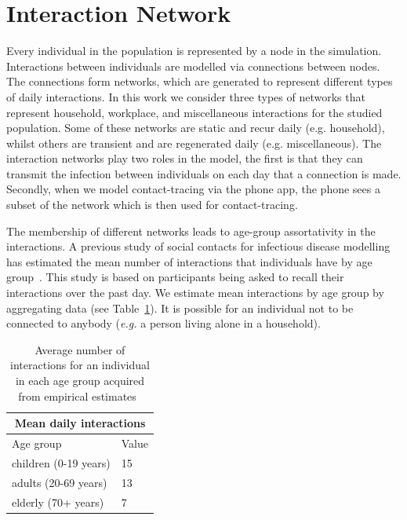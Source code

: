 \documentclass[12pt, oneside]{amsart}   	%
\begin{document}
\section{Interaction Network}\label{section_ibm_networks}

Every individual in the population is represented by a node in the simulation. 
Interactions between individuals are modelled via connections between nodes.
The connections form networks, which are generated to represent different types of daily interactions.
In this work we consider three types of networks that represent household, workplace, and miscellaneous interactions for the studied population.
Some of these networks are static and recur daily (e.g. household), whilst others are transient and are regenerated daily (e.g.  miscellaneous).
The interaction networks play two roles in the model, the first is that they can transmit the infection between individuals on each day that a connection is made.
Secondly, when we model contact-tracing via the phone app, the phone sees a subset of the network which is then used for contact-tracing.

The membership of different networks leads to age-group assortativity in the interactions.
A previous study of social contacts for infectious disease modelling has estimated the mean number of interactions that individuals have by age group~\citep{mossong2008social}.
This study is based on participants being asked to recall their interactions over the past day. 
We estimate mean interactions by age group by aggregating data (see Table~\ref{table_mean_daily_interactions}).
It is possible for an individual not to be connected to anybody (\emph{e.g.} a person living alone in a household).

\begin{table}
\centering
\begin{tabular}{ |p{5cm}|p{1.5cm}|  }
 \hline
 \multicolumn{2}{|c|}{Mean daily interactions} \\
 \hline
Age group  & Value \\
 \hline
 \hline 
children (0-19 years) & 15 \\
adults (20-69 years) & 13 \\
elderly (70+ years) & 7 \\
 \hline
\end{tabular}
\caption{Average number of interactions for an individual in each age group  acquired from empirical estimates~\citep{mossong2008social}}
\label{table_mean_daily_interactions}
\end{table}
\end{document}
